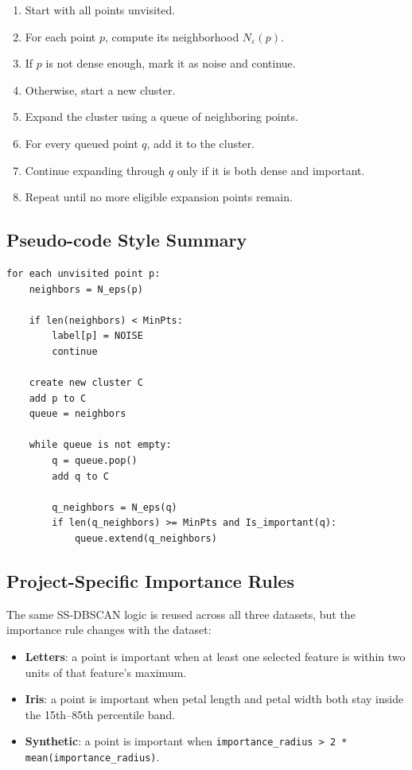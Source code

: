 \documentclass[11pt,a4paper]{article}
\begin{document}
\begin{enumerate}[leftmargin=1.6em]
\item Start with all points unvisited.
\item For each point $p$, compute its neighborhood $N_{\varepsilon}(p)$.
\item If $p$ is not dense enough, mark it as noise and continue.
\item Otherwise, start a new cluster.
\item Expand the cluster using a queue of neighboring points.
\item For every queued point $q$, add it to the cluster.
\item Continue expanding through $q$ only if it is both dense and important.
\item Repeat until no more eligible expansion points remain.
\end{enumerate}

\subsection{Pseudo-code Style Summary}

\begin{lstlisting}[style=pythonstyle,caption={Paper-style clustering logic in simplified pseudo-code.}]
for each unvisited point p:
    neighbors = N_eps(p)

    if len(neighbors) < MinPts:
        label[p] = NOISE
        continue

    create new cluster C
    add p to C
    queue = neighbors

    while queue is not empty:
        q = queue.pop()
        add q to C

        q_neighbors = N_eps(q)
        if len(q_neighbors) >= MinPts and Is_important(q):
            queue.extend(q_neighbors)
\end{lstlisting}

\subsection{Project-Specific Importance Rules}

The same SS-DBSCAN logic is reused across all three datasets, but the
importance rule changes with the dataset:

\begin{itemize}
\item \textbf{Letters}: a point is important when at least one selected feature
is within two units of that feature's maximum.
\item \textbf{Iris}: a point is important when petal length and petal width both
stay inside the 15th--85th percentile band.
\item \textbf{Synthetic}: a point is important when
\texttt{importance\_radius > 2 * mean(importance\_radius)}.
\end{itemize}
\end{document}
